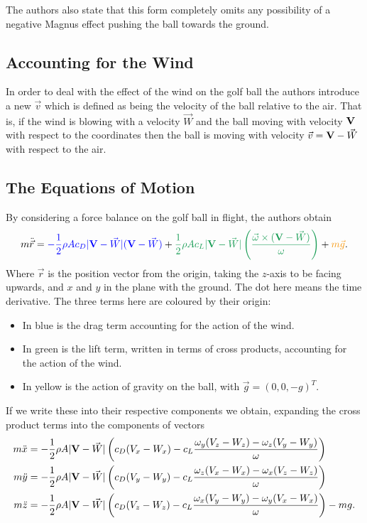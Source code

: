 The authors also state that this form completely omits any possibility of a negative Magnus effect 
pushing the ball towards the ground.

\subsection{Accounting for the Wind}

In order to deal with the effect of the wind on the golf ball the authors introduce a new $\vec{v}$
which is defined as being the velocity of the ball relative to the air. That is, if the wind is blowing
with a velocity $\vec{W}$ and the ball moving with velocity $\mathbf{V}$ with respect to the coordinates then
the ball is moving with velocity $\vec{v} = \mathbf{V} - \vec{W}$ with respect to the air.

\subsection{The Equations of Motion}

By considering a force balance on the golf ball in flight, the authors obtain
\begin{equation}
m \ddot{\vec{r}} = {\color{blue} - \frac{1}{2}\rho A c_D |\vv - \vec{W}|(\vv - \vec{W})} + {\color{ForestGreen} \frac{1}{2} \rho A c_L
|\vv - \vec{W}| \left(\frac{\vec{\omega} \times (\vv - \vec{W})}{\omega}\right)} + {\color{YellowOrange}m \vec{g}} .
\end{equation}
Where $\vec{r}$ is the position vector from the origin, taking the $z$-axis to be facing upwards, and $x$ and $y$ in the plane with the ground. The dot here means the time derivative. 
The three terms here are coloured by their origin:
\begin{itemize}
\item In blue is the drag term accounting for the action of the wind.
\item In green is the lift term, written in terms of cross products, accounting for the action of
the wind.
\item In yellow is the action of gravity on the ball, with $\vec{g} = (0,0,-g)^{T}$.
\end{itemize}

If we write these into their respective components we obtain, expanding the cross product terms into
the components of vectors
\begin{subequations}
\begin{align}
m \ddot{x} &= -\frac{1}{2} \rho A |\mathbf{V} - \vec{W}| \left(c_D (V_x - W_x) - c_L \frac{\omega_y (V_z - W_z)
- \omega_z (V_y - W_y)}{\omega} \right) \\
m \ddot{y} &= -\frac{1}{2} \rho A |\mathbf{V} - \vec{W}| \left(c_D (V_y - W_y) - c_L \frac{\omega_z (V_x - W_x)
- \omega_x (V_z - W_z)}{\omega} \right) \\
m \ddot{z} &= -\frac{1}{2} \rho A |\mathbf{V} - \vec{W}| \left(c_D (V_z - W_z) - c_L \frac{\omega_x (V_y - W_y)
- \omega_y (V_x - W_x)}{\omega} \right) - mg .
\end{align}
\end{subequations}

